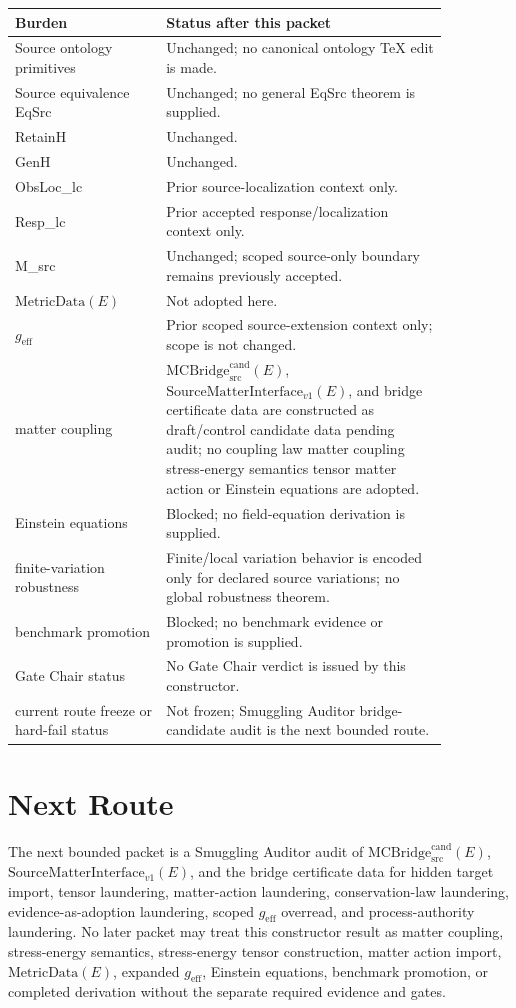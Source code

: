 \documentclass[11pt]{article}
\newcommand{\MetricData}{\mathrm{MetricData}}
\newcommand{\geff}{g_{\mathrm{eff}}}
\newcommand{\MCBridgeCand}{\mathrm{MCBridge}_{\mathrm{src}}^{\mathrm{cand}}}
\newcommand{\SMI}{\mathrm{SourceMatterInterface}_{v1}}
\begin{document}
\begin{longtable}{p{0.30\linewidth}p{0.56\linewidth}}
\toprule
Burden & Status after this packet \\
\midrule
Source ontology primitives & Unchanged; no canonical ontology TeX edit is made. \\
Source equivalence EqSrc & Unchanged; no general EqSrc theorem is supplied. \\
RetainH & Unchanged. \\
GenH & Unchanged. \\
ObsLoc_lc & Prior source-localization context only. \\
Resp_lc & Prior accepted response/localization context only. \\
M_src & Unchanged; scoped source-only boundary remains previously accepted. \\
\(\MetricData(E)\) & Not adopted here. \\
\(\geff\) & Prior scoped source-extension context only; scope is not changed. \\
matter coupling & \(\MCBridgeCand(E)\), \(\SMI(E)\), and bridge certificate data are constructed as draft/control candidate data pending audit; no coupling law matter coupling stress-energy semantics tensor matter action or Einstein equations are adopted. \\
Einstein equations & Blocked; no field-equation derivation is supplied. \\
finite-variation robustness & Finite/local variation behavior is encoded only for declared source variations; no global robustness theorem. \\
benchmark promotion & Blocked; no benchmark evidence or promotion is supplied. \\
Gate Chair status & No Gate Chair verdict is issued by this constructor. \\
current route freeze or hard-fail status & Not frozen; Smuggling Auditor bridge-candidate audit is the next bounded route. \\
\bottomrule
\end{longtable}

\section{Next Route}

The next bounded packet is a Smuggling Auditor audit of
\(\MCBridgeCand(E)\), \(\SMI(E)\), and the bridge certificate data for hidden
target import, tensor laundering, matter-action laundering, conservation-law
laundering, evidence-as-adoption laundering, scoped \(\geff\) overread, and
process-authority laundering. No later packet may treat this constructor
result as matter coupling, stress-energy semantics, stress-energy tensor
construction, matter action import, \(\MetricData(E)\), expanded \(\geff\),
Einstein equations, benchmark promotion, or completed derivation without the
separate required evidence and gates.
\end{document}
